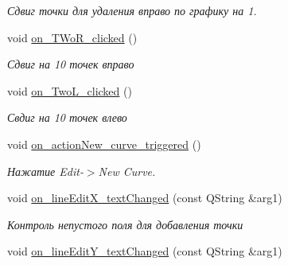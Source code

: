 \begin{DoxyCompactItemize}
\begin{DoxyCompactList}\small\item\em Сдвиг точки для удаления вправо по графику на 1. \end{DoxyCompactList}\item 
void \hyperlink{class_main_window_ac38bdf92edc1e6cbd07cced4497aa964}{on\+\_\+\+T\+Wo\+R\+\_\+clicked} ()\hypertarget{class_main_window_ac38bdf92edc1e6cbd07cced4497aa964}{}\label{class_main_window_ac38bdf92edc1e6cbd07cced4497aa964}

\begin{DoxyCompactList}\small\item\em Сдвиг на 10 точек вправо \end{DoxyCompactList}\item 
void \hyperlink{class_main_window_a3fd8329ca1b8ee5d2ac4da65ee5b6617}{on\+\_\+\+Two\+L\+\_\+clicked} ()\hypertarget{class_main_window_a3fd8329ca1b8ee5d2ac4da65ee5b6617}{}\label{class_main_window_a3fd8329ca1b8ee5d2ac4da65ee5b6617}

\begin{DoxyCompactList}\small\item\em Свдиг на 10 точек влево \end{DoxyCompactList}\item 
void \hyperlink{class_main_window_a39584a1d717e2430f7c8666071760335}{on\+\_\+action\+New\+\_\+curve\+\_\+triggered} ()\hypertarget{class_main_window_a39584a1d717e2430f7c8666071760335}{}\label{class_main_window_a39584a1d717e2430f7c8666071760335}

\begin{DoxyCompactList}\small\item\em Нажатие Edit-\/$>$New Curve. \end{DoxyCompactList}\item 
void \hyperlink{class_main_window_afa3811da5b85f09d356f9c417970fb5d}{on\+\_\+line\+Edit\+X\+\_\+text\+Changed} (const Q\+String \&arg1)\hypertarget{class_main_window_afa3811da5b85f09d356f9c417970fb5d}{}\label{class_main_window_afa3811da5b85f09d356f9c417970fb5d}

\begin{DoxyCompactList}\small\item\em Контроль непустого поля для добавления точки \end{DoxyCompactList}\item 
void \hyperlink{class_main_window_a5f00712967779082bc1e5099f139c0c4}{on\+\_\+line\+Edit\+Y\+\_\+text\+Changed} (const Q\+String \&arg1)\hypertarget{class_main_window_a5f00712967779082bc1e5099f139c0c4}{}\label{class_main_window_a5f00712967779082bc1e5099f139c0c4}


\end{DoxyCompactItemize}
